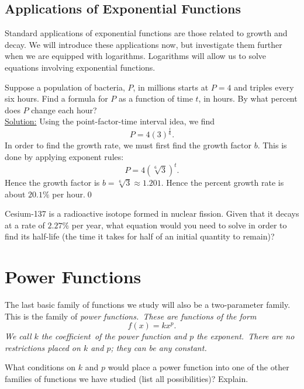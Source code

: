 \begin{eg}
\subsection{Applications of Exponential Functions}

Standard applications of exponential functions are those related to growth and decay. We will introduce these applications now, but investigate them further when we are equipped with logarithms. Logarithms will allow us to solve equations involving exponential functions.

\begin{eg} Suppose a population of bacteria, $P$, in millions starts at $P = 4$ and triples every six hours. Find a formula for $P$ as a function of time $t$, in hours. By what percent does $P$ change each hour?\\
\underline{Solution:} Using the point-factor-time interval idea, we find 
\[
P = 4(3)^{\frac{t}{6}}.
\]
In order to find the growth rate, we must first find the growth factor $b$. This is done by applying exponent rules:
\[
P = 4(\sqrt[6]{3})^{t}.
\]
Hence the growth factor is $b = \sqrt[6]{3}\approx 1.201$. Hence the percent growth rate is about $20.1\%$ per hour.\qed \end{eg}

\begin{question} Cesium-137 is a radioactive isotope formed in nuclear fission. Given that it decays at a rate of $2.27\%$ per year, what equation would you need to solve in order to find its half-life (the time it takes for half of an initial quantity to remain)?
\end{question}


\section{Power Functions}

The last basic family of functions we study will also be a two-parameter family. This is the family of \it{power functions}.\normalfont\ These are functions of the form 
\[
f(x) = kx^{p}.
\]
We call $k$ the \it{coefficient}\ \normalfont of the power function and $p$ the \it{exponent}.\normalfont\ There are no restrictions placed on $k$ and $p$; they can be any constant.

\par

\begin{question} What conditions on $k$ and $p$ would place a power function into one of the other families of functions we have studied (list all possibilities)? Explain.
\end{question}


\end{eg}
